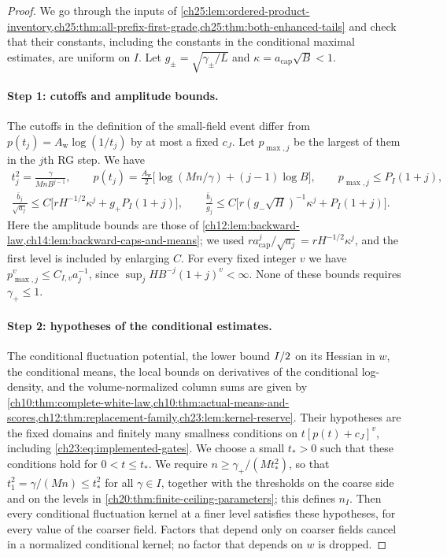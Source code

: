 \begin{proof}
We go through the inputs of \cref{ch25:lem:ordered-product-inventory,ch25:thm:all-prefix-first-grade,ch25:thm:both-enhanced-tails} and check that their constants, including the constants in the conditional maximal estimates, are uniform on $I$. Let $g_\pm=\sqrt{\gamma_\pm/L}$ and $\kappa=a_{\mathrm{cap}}\sqrt B<1$.

\paragraph{Step 1: cutoffs and amplitude bounds.}
The cutoffs in the definition of the small-field event differ from $p(t_j)=A_{\mathrm w}\log(1/t_j)$ by at most a fixed $c_J$. Let $p_{\max,j}$ be the largest of them in the $j$th RG step. We have
\begin{equation}\label{ch25:eq:finite-ceiling-cuts-caps}
 \begin{gathered}
 t_j^2=\frac{\gamma}{MnB^{j-1}},\qquad
 p(t_j)=\frac{A_{\mathrm w}}2\bigl[\log(Mn/\gamma)+(j-1)\log B\bigr],\qquad
 p_{\max,j}\le P_I(1+j),\\
 \frac{\bar b_j}{\sqrt{a_j}}\le C\bigl[rH^{-1/2}\kappa^j+g_+P_I(1+j)\bigr],\qquad
 \frac{\bar b_j}{g_j}\le C\bigl[r(g_-\sqrt H)^{-1}\kappa^j+P_I(1+j)\bigr].
 \end{gathered}
\end{equation}
Here the amplitude bounds are those of \cref{ch12:lem:backward-law,ch14:lem:backward-caps-and-means}; we used $ra_{\mathrm{cap}}^j/\sqrt{a_j}=rH^{-1/2}\kappa^j$, and the first level is included by enlarging $C$. For every fixed integer $v$ we have $p_{\max,j}^v\le C_{I,v}a_j^{-1}$, since $\sup_jHB^{-j}(1+j)^v<\infty$. None of these bounds requires $\gamma_+\le1$.

\paragraph{Step 2: hypotheses of the conditional estimates.}
The conditional fluctuation potential, the lower bound $I/2$ on its Hessian in $w$, the conditional means, the local bounds on derivatives of the conditional log-density, and the volume-normalized column sums are given by \cref{ch10:thm:complete-white-law,ch10:thm:actual-means-and-scores,ch12:thm:replacement-family,ch23:lem:kernel-reserve}. Their hypotheses are the fixed domains and finitely many smallness conditions on $t[p(t)+c_J]^v$, including \eqref{ch23:eq:implemented-gates}. We choose a small $t_*>0$ such that these conditions hold for $0<t\le t_*$. We require $n\ge\gamma_+/(Mt_*^2)$, so that $t_1^2=\gamma/(Mn)\le t_*^2$ for all $\gamma\in I$, together with the thresholds on the coarse side and on the levels in \cref{ch20:thm:finite-ceiling-parameters}; this defines $n_I$. Then every conditional fluctuation kernel at a finer level satisfies these hypotheses, for every value of the coarser field. Factors that depend only on coarser fields cancel in a normalized conditional kernel; no factor that depends on $w$ is dropped.


\end{proof}
